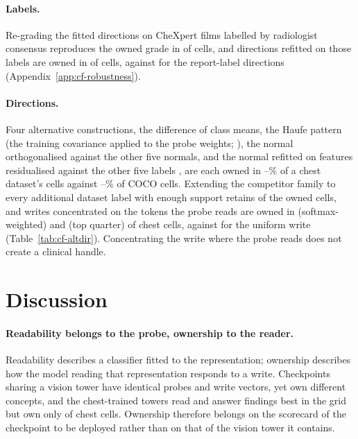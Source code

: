 \documentclass{article}
\begin{document}
\paragraph{Labels.} Re-grading the fitted directions on \cfValidRows{} CheXpert films labelled by radiologist consensus \citep{irvin2019chexpert} reproduces the owned grade in \cfValidOwnedAgree{} of \cfValidCells{} cells, and directions refitted on those labels are owned in \cfValidfitOwnedExpert{} of \cfValidfitCells{} cells, against \cfValidfitOwnedReport{} for the report-label directions (Appendix~\ref{app:cf-robustness}).

\paragraph{Directions.} Four alternative constructions, the difference of class means, the Haufe pattern (the training covariance applied to the probe weights; \citealp{haufe2014interpretation}), the normal orthogonalised against the other five normals, and the normal refitted on features residualised against the other five labels \citep{nicolson2025explaining}, are each owned in \cfAltdirChestPctMin{}--\cfAltdirChestPctMax\% of a chest dataset's cells against \cfAltdirCocoPctMin{}--\cfAltdirCocoPctMax\% of COCO cells. Extending the competitor family to every additional dataset label with enough support retains \cfExtcompRetained{} of the \cfExtcompOwned{} owned cells, and writes concentrated on the tokens the probe reads are owned in \cfTokenwSoftChestOwned{} (softmax-weighted) and \cfTokenwTopqChestOwned{} (top quarter) of \cfTokenwChestCells{} chest cells, against \cfTokenwUniformChestOwned{} for the uniform write (Table~\ref{tab:cf-altdir}). Concentrating the write where the probe reads does not create a clinical handle.

\FloatBarrier
\section{Discussion}
\label{sec:implications}

\paragraph{Readability belongs to the probe, ownership to the reader.}
Readability describes a classifier fitted to the representation; ownership describes how the model reading that representation responds to a write. Checkpoints sharing a vision tower have identical probes and write vectors, yet own different concepts, and the chest-trained towers read and answer findings best in the grid but own only \cfSpecTowerOwned{} of \cfSpecTowerN{} chest cells. Ownership therefore belongs on the scorecard of the checkpoint to be deployed rather than on that of the vision tower it contains.
\end{document}
